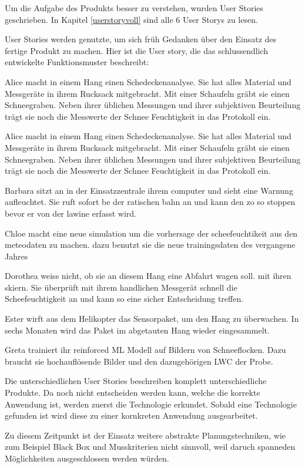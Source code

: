 Um die Aufgabe des Produkts besser zu verstehen, wurden User Stories geschrieben. In Kapitel \ref{userstoryvoll} sind alle 6 User Storys zu lesen.

User Stories werden genutzte, um sich früh Gedanken über den Einsatz des fertige Produkt zu machen. Hier ist die User story, die das schlussendlich entwickelte Funktionsmuster beschreibt:

Alice macht in einem Hang einen Schedeckenanalyse. Sie hat alles Material und Messgeräte in ihrem Rucksack mitgebracht. Mit einer Schaufeln gräbt sie einen Schneegraben. Neben ihrer üblichen Messungen und ihrer subjektiven Beurteilung trägt sie noch die Messwerte der Schnee Feuchtigkeit in das Protokoll ein.


Alice macht in einem Hang einen Schedeckenanalyse. Sie hat alles Material und Messgeräte in ihrem Rucksack mitgebracht. Mit einer Schaufeln gräbt sie einen Schneegraben. Neben ihrer üblichen Messungen und ihrer subjektiven Beurteilung trägt sie noch die Messwerte der Schnee Feuchtigkeit in das Protokoll ein.

Barbara sitzt an in der Einsatzzentrale ihrem computer und sieht eine Warnung aufleuchtet. Sie ruft  sofort be der ratischen bahn an und kann den zo so stoppen bevor er von der lawine erfasst wird.

Chloe macht eine neue simulation um die vorhersage der scheefeuchtikeit aus den meteodaten zu machen. dazu benutzt sie die neue trainingsdaten des vergangene Jahres 

Dorothea weiss nicht, ob sie an diesem Hang eine Abfahrt wagen soll. mit ihren skiern. Sie überprüft mit ihrem handlichen Messgerät schnell die Scheefeuchtigkeit an und kann so eine sicher Entscheidung treffen.

Ester wirft aus dem Helikopter das Sensorpaket, um den Hang zu überwachen. In sechs Monaten wird das Paket im abgetauten Hang wieder eingesammelt.

Greta trainiert ihr reinforced ML Modell auf Bildern von Schneeflocken. Dazu braucht sie hochauflösende Bilder und den dazugehörigen LWC der Probe.


Die unterschiedlichen User Stories beschreiben komplett unterschiedliche Produkte. Da noch nicht entscheiden werden kann, welche die korrekte Anwendung ist, werden zuerst die Technologie erkundet. Sobald eine Technologie gefunden ist wird diese zu einer kornkreten Anwendung ausgearbeitet.

Zu diesem Zeitpunkt ist der Einsatz weitere abstrakte Planungstechniken, wie zum Beispiel Black Box und Musskriterien nicht sinnvoll, weil daruch spanneden Möglichkeiten ausgeschlossen werden würden.

